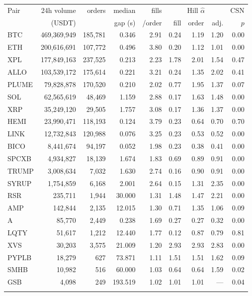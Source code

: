 \begin{tabular}{@{}lrrrrrrrr@{}}
\toprule
Pair & 24h volume & orders & median & fills & \multicolumn{3}{c}{Hill $\hat\alpha$} & CSN \\
 & (USDT) & & gap (s) & /order & fill & order & adj. & $p$ \\
\colrule
BTC & 469{,}369{,}949 & 185{,}781 & 0.346 & 2.91 & 0.24 & 1.19 & 1.20 & 0.00 \\
ETH & 200{,}616{,}691 & 107{,}772 & 0.496 & 3.80 & 0.20 & 1.12 & 1.01 & 0.00 \\
XPL & 177{,}849{,}163 & 237{,}525 & 0.213 & 2.23 & 1.78 & 2.01 & 1.54 & 0.47 \\
ALLO & 103{,}539{,}172 & 175{,}614 & 0.221 & 3.21 & 0.24 & 1.35 & 2.02 & 0.41 \\
PLUME & 79{,}828{,}878 & 170{,}520 & 0.210 & 2.02 & 0.77 & 1.95 & 1.37 & 0.07 \\
SOL & 62{,}565{,}619 & 48{,}469 & 1.159 & 2.88 & 0.17 & 1.63 & 1.48 & 0.00 \\
XRP & 35{,}249{,}120 & 29{,}505 & 1.757 & 3.08 & 0.17 & 1.36 & 1.37 & 0.00 \\
HEMI & 23{,}990{,}471 & 118{,}193 & 0.124 & 3.79 & 0.23 & 0.64 & 0.70 & 0.70 \\
LINK & 12{,}732{,}843 & 120{,}988 & 0.076 & 3.25 & 0.23 & 0.53 & 0.52 & 0.00 \\
BICO & 8{,}441{,}674 & 94{,}197 & 0.052 & 1.98 & 0.23 & 0.38 & 0.41 & 0.00 \\
SPCXB & 4{,}934{,}827 & 18{,}139 & 1.674 & 1.83 & 0.69 & 0.89 & 0.91 & 0.00 \\
TRUMP & 3{,}008{,}634 & 7{,}032 & 1.630 & 2.74 & 0.16 & 0.90 & 0.91 & 0.00 \\
SYRUP & 1{,}754{,}859 & 6{,}168 & 2.001 & 2.64 & 0.15 & 1.31 & 2.35 & 0.00 \\
RSR & 235{,}711 & 1{,}944 & 30.000 & 1.31 & 1.48 & 1.47 & 2.21 & 0.00 \\
AMP & 142{,}844 & 2{,}135 & 12.015 & 1.30 & 0.71 & 1.35 & 1.06 & 0.09 \\
A & 85{,}770 & 2{,}449 & 0.238 & 1.69 & 0.27 & 0.27 & 0.32 & 0.00 \\
LQTY & 51{,}617 & 1{,}212 & 12.440 & 1.77 & 0.12 & 0.87 & 0.79 & 0.81 \\
XVS & 30{,}203 & 3{,}575 & 21.009 & 1.20 & 2.93 & 2.93 & 2.83 & 0.00 \\
PYPLB & 18{,}279 & 627 & 73.871 & 1.11 & 1.51 & 1.51 & 1.62 & 0.09 \\
SMHB & 10{,}982 & 516 & 60.000 & 1.03 & 0.64 & 0.64 & 1.59 & 0.02 \\
GSB & 4{,}098 & 249 & 193.519 & 1.02 & 1.01 & 1.01 & --- & 0.04 \\
\botrule
\end{tabular}